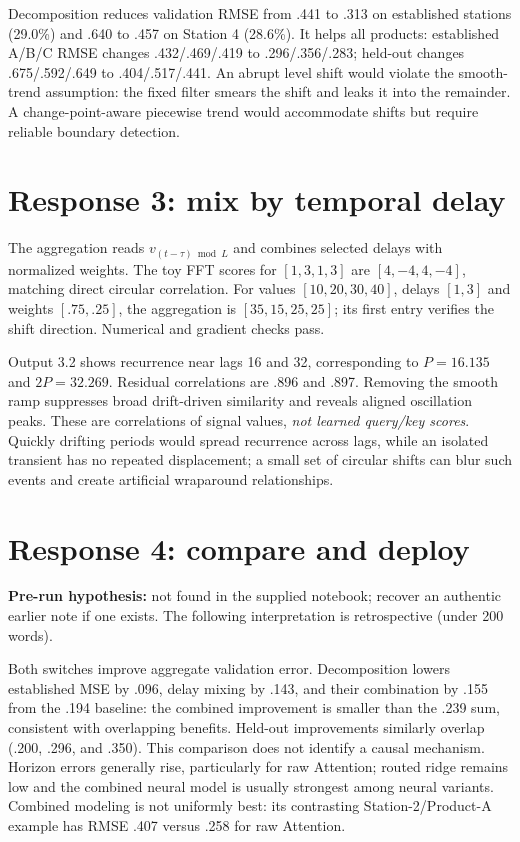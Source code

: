 \documentclass[10pt,a4paper]{article}
\begin{document}
Decomposition reduces validation RMSE from .441 to .313 on established stations (29.0\%) and .640 to .457 on Station 4 (28.6\%). It helps all products: established A/B/C RMSE changes .432/.469/.419 to .296/.356/.283; held-out changes .675/.592/.649 to .404/.517/.441. An abrupt level shift would violate the smooth-trend assumption: the fixed filter smears the shift and leaks it into the remainder. A change-point-aware piecewise trend would accommodate shifts but require reliable boundary detection.

\section*{Response 3: mix by temporal delay}
The aggregation reads $v_{(t-\tau)\bmod L}$ and combines selected delays with normalized weights. The toy FFT scores for $[1,3,1,3]$ are $[4,-4,4,-4]$, matching direct circular correlation. For values $[10,20,30,40]$, delays $[1,3]$ and weights $[.75,.25]$, the aggregation is $[35,15,25,25]$; its first entry verifies the shift direction. Numerical and gradient checks pass.

Output 3.2 shows recurrence near lags 16 and 32, corresponding to $P=16.135$ and $2P=32.269$. Residual correlations are .896 and .897. Removing the smooth ramp suppresses broad drift-driven similarity and reveals aligned oscillation peaks. These are correlations of signal values, \emph{not learned query/key scores}. Quickly drifting periods would spread recurrence across lags, while an isolated transient has no repeated displacement; a small set of circular shifts can blur such events and create artificial wraparound relationships.

\section*{Response 4: compare and deploy}
\textbf{Pre-run hypothesis:} not found in the supplied notebook; recover an authentic earlier note if one exists. The following interpretation is retrospective (under 200 words).

Both switches improve aggregate validation error. Decomposition lowers established MSE by .096, delay mixing by .143, and their combination by .155 from the .194 baseline: the combined improvement is smaller than the .239 sum, consistent with overlapping benefits. Held-out improvements similarly overlap (.200, .296, and .350). This comparison does not identify a causal mechanism. Horizon errors generally rise, particularly for raw Attention; routed ridge remains low and the combined neural model is usually strongest among neural variants. Combined modeling is not uniformly best: its contrasting Station-2/Product-A example has RMSE .407 versus .258 for raw Attention.
\end{document}
